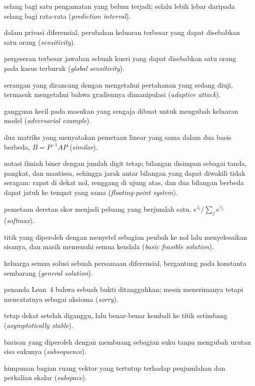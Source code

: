 \begin{description}[style=nextline,itemsep=0.35em]
  \item[Selang prediksi] selang bagi satu pengamatan yang belum terjadi; selalu lebih lebar daripada selang bagi rata-rata (\emph{prediction interval}).
  \item[Sensitivitas] dalam privasi diferensial, perubahan keluaran terbesar yang dapat disebabkan satu orang (\emph{sensitivity}).
  \item[Sensitivitas global] pergeseran terbesar jawaban sebuah kueri yang dapat disebabkan satu orang pada kasus terburuk (\emph{global sensitivity}).
  \item[Serangan adaptif] serangan yang dirancang dengan mengetahui pertahanan yang sedang diuji, termasuk mengetahui bahwa gradiennya dimanipulasi (\emph{adaptive attack}).
  \item[Serangan adversarial] gangguan kecil pada masukan yang sengaja dibuat untuk mengubah keluaran model (\emph{adversarial example}).
  \item[Serupa] dua matriks yang menyatakan pemetaan linear yang sama dalam dua basis berbeda, $B=P^{-1}AP$ (\emph{similar}).
  \item[Sistem floating-point] notasi ilmiah biner dengan jumlah digit tetap; bilangan disimpan sebagai tanda, pangkat, dan mantissa, sehingga jarak antar bilangan yang dapat diwakili tidak seragam: rapat di dekat nol, renggang di ujung atas, dan dua bilangan berbeda dapat jatuh ke tempat yang sama (\emph{floating-point system}).
  \item[Softmax] pemetaan deretan skor menjadi peluang yang berjumlah satu, $e^{z_i}/\sum_j e^{z_j}$ (\emph{softmax}).
  \item[Solusi layak basis] titik yang diperoleh dengan menyetel sebagian peubah ke nol lalu menyelesaikan sisanya, dan masih memenuhi semua kendala (\emph{basic feasible solution}).
  \item[Solusi umum] keluarga semua solusi sebuah persamaan diferensial, bergantung pada konstanta sembarang (\emph{general solution}).
  \item[Sorry] penanda Lean~4 bahwa sebuah bukti ditangguhkan; mesin menerimanya tetapi mencatatnya sebagai aksioma (\emph{sorry}).
  \item[Stabil asimtotik] tetap dekat setelah diganggu, lalu benar-benar kembali ke titik setimbang (\emph{asymptotically stable}).
  \item[Subbarisan] barisan yang diperoleh dengan membuang sebagian suku tanpa mengubah urutan sisa sukunya (\emph{subsequence}).
  \item[Subruang] himpunan bagian ruang vektor yang tertutup terhadap penjumlahan dan perkalian skalar (\emph{subspace}).

\end{description}
